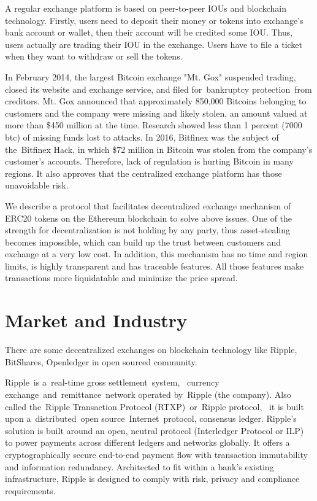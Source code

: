 \documentclass[UTF8,nofonts]{article}
\begin{document}
A regular exchange platform is based on peer-to-peer IOUs and blockchain technology. Firstly,  users need to deposit their money or tokens into exchange's  bank account or wallet,  then their account will be credited some IOU. Thus,  users actually are trading their IOU in the exchange. Users have to file a ticket when they want to withdraw or sell the tokens.

In February 2014,  the largest Bitcoin exchange "Mt. Gox" suspended trading,  closed its website and exchange service,  and filed for bankruptcy protection from creditors\cite{mcmillan2014inside}. Mt. Gox announced that approximately 850,000 Bitcoins belonging to customers and the company were missing and likely stolen,  an amount valued at more than \$450 million at the time. Research showed less than 1 percent (7000 btc) of missing funds lost to attacks. In 2016,  Bitfinex was the subject of the Bitfinex Hack, in which \$72 million in Bitcoin was stolen from the company's customer's accounts. Therefore,  lack of regulation is hurting Bitcoin in many regions. It also approves that the centralized exchange platform has those unavoidable risk.

We describe a protocol that facilitates decentralized exchange mechanism of ERC20 tokens on the Ethereum blockchain to solve above issues. One of the strength for decentralization is not holding by any party,  thus asset-stealing becomes impossible, which can build up the trust between customers and exchange at a very low cost. In addition, this mechanism has no time and region limits, is highly transparent and has traceable features. All those features make transactions more liquidatable and minimize the price spread.

\section{Market and Industry\label{sec: existingworks}}

There are some decentralized exchanges on blockchain technology like Ripple,  BitShares,  Openledger in open sourced community.

Ripple\cite{schwartz2014ripple} is a real-time gross settlement system,  currency exchange and remittance network operated by Ripple (the company). Also called the Ripple Transaction Protocol (RTXP) or Ripple protocol,  it is built upon a distributed open source Internet protocol,  consensus ledger. Ripple's solution is built around an open,  neutral protocol (Interledger Protocol or ILP\cite{thomas2015protocol}) to power payments across different ledgers and networks globally. It offers a cryptographically secure end-to-end payment flow with transaction immutability and information redundancy. Architected to fit within a bank's existing infrastructure,  Ripple is designed to comply with risk,  privacy and compliance requirements.
\end{document}
